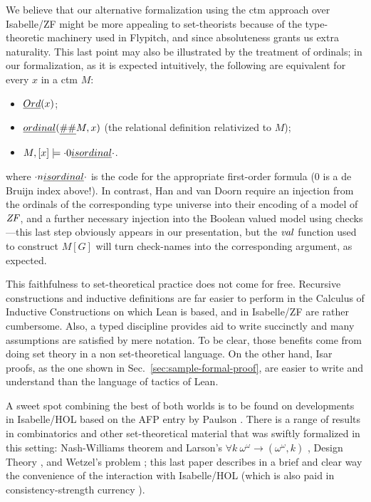 We believe that our alternative formalization using the ctm approach
over Isabelle/ZF might be more appealing to set-theorists because of the
type-theoretic machinery used in Flypitch, and %
since absoluteness grants us extra naturality. This last point may also
be illustrated by the treatment of ordinals; in our formalization, as
it is expected intuitively, the following are equivalent for every $x$
in a ctm $M$:
\begin{itemize}
\item $\isa{Ord}(x)$;
\item $\isa{ordinal}(\isa{\#\#}M,x)$ (the relational
  definition relativized to $M$);
\item
  $M,[x] \models {\cdot}0\isa{ is ordinal}{\cdot}$.
\end{itemize}
where ${\cdot}n\isa{ is ordinal}{\cdot}$ is the code for the
appropriate first-order formula  ($0$ is a de
Bruijn index above!). In contrast, Han and van Doorn require an
injection from the ordinals of the corresponding type universe into
their encoding of a model of $\mathit{ZF}$, and a further necessary injection into the Boolean
valued model using checks---this last step obviously appears in our
presentation, but the $\operatorname{\mathit{val}}$ function used to construct $M[G]$ will turn
check-names into the corresponding argument, as expected.

This faithfulness to set-theoretical practice does not come for
free. Recursive constructions and inductive definitions are far easier
to perform in the Calculus of Inductive Constructions on which Lean
is based, and in Isabelle/ZF are rather cumbersome. Also, a
typed discipline provides aid to write succinctly and many assumptions
are satisfied by mere notation. To be clear, those benefits come from
doing set theory in a non set-theoretical language. On the other
hand, Isar proofs, as the one shown in
Sec.~\ref{sec:sample-formal-proof}, are easier to write and understand
than the language of tactics of Lean.

A sweet spot combining the best of both worlds is to be found on
developments in Isabelle/HOL based on the AFP entry
 by Paulson \cite{ZFC_in_HOL-AFP}. There is a
range of results in combinatorics and other set-theoretical material
that was swiftly formalized in this setting: Nash-Williams theorem and
Larson's $\forall k\ \omega^{\omega}\longrightarrow(\omega^\omega,k)$
\cite{doi:10.1080/10586458.2021.1980464}, Design Theory
\cite{10.1007/978-3-030-81097-9_1}, and Wetzel's problem
\cite{2022arXiv220503159P}; this last paper describes in a brief and
clear way the convenience of the interaction with Isabelle/HOL
(which is also paid in consistency-strength currency
\cite[Sect.~3]{DBLP:conf/ictac/Obua06}).

